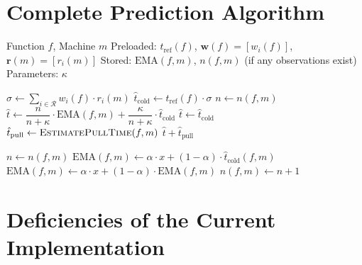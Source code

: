 \documentclass[11pt, a4paper]{article}
\newcommand{\bluecontentbegin}{\begingroup\color{blue!70!black}}
\newcommand{\bluecontentend}{\endgroup}
\begin{document}
\section{Complete Prediction Algorithm}
\label{sec:algorithm}
\bluecontentbegin

\begin{algorithm}[H]
\caption{Predict Runtime for $(f, m)$}
\label{alg:predict}
\begin{algorithmic}[1]
\Require Function $f$, Machine $m$
\Require Preloaded: $t_{\mathrm{ref}}(f)$,
         $\mathbf{w}(f) = [w_i(f)]$,
         $\mathbf{r}(m) = [r_i(m)]$
\Require Stored: $\mathrm{EMA}(f,m)$, $n(f,m)$
         (if any observations exist)
\Require Parameters: $\kappa$

\Statex

    \State $\sigma \gets \displaystyle\sum_{i \in \mathcal{R}}
           w_i(f) \cdot r_i(m)$
    \State $\hat{t}_{\mathrm{cold}} \gets
           t_{\mathrm{ref}}(f) \cdot \sigma$
    \Statex
    \State $n \gets n(f, m)$
        \State $\hat{t} \gets \dfrac{n}{n + \kappa}
               \cdot \mathrm{EMA}(f,m)
               + \dfrac{\kappa}{n + \kappa}
               \cdot \hat{t}_{\mathrm{cold}}$
    \Else
        \State $\hat{t} \gets \hat{t}_{\mathrm{cold}}$
    \EndIf
    \Statex
    \State $\hat{t}_{\mathrm{pull}} \gets
           \Call{EstimatePullTime}{f, m}$
    \State \Return $\hat{t} + \hat{t}_{\mathrm{pull}}$
\EndFunction

\Statex
\Statex

    \State $n \gets n(f, m)$
        \State $\mathrm{EMA}(f,m) \gets \alpha \cdot x
               + (1-\alpha) \cdot \hat{t}_{\mathrm{cold}}(f,m)$
    \Else
        \State $\mathrm{EMA}(f,m) \gets \alpha \cdot x
               + (1-\alpha) \cdot \mathrm{EMA}(f,m)$
    \EndIf
    \State $n(f,m) \gets n + 1$
\EndFunction

\end{algorithmic}
\end{algorithm}
\bluecontentend

\section{Deficiencies of the Current Implementation}
\label{app:broken}
\bluecontentbegin
\end{document}
